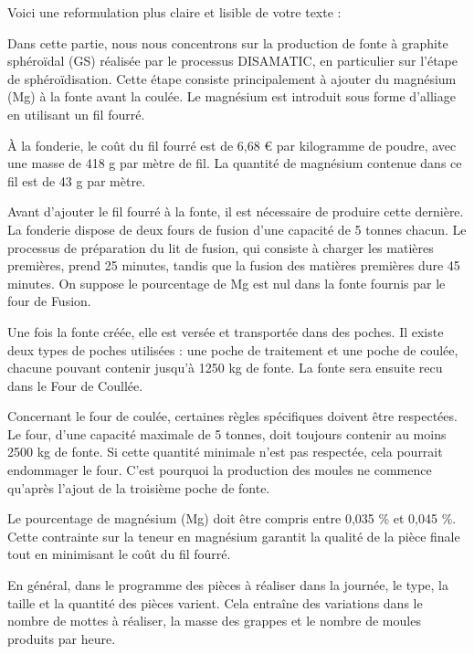 \documentclass[12pt]{article}
\begin{document}
Voici une reformulation plus claire et lisible de votre texte :

Dans cette partie, nous nous concentrons sur la production de fonte à 
graphite sphéroïdal (GS) réalisée par le processus DISAMATIC, en 
particulier sur l’étape de sphéroïdisation. Cette étape consiste 
principalement à ajouter du magnésium (Mg) à la fonte avant la coulée. 
Le magnésium est introduit sous forme d'alliage en utilisant un fil fourré.

À la fonderie, le coût du fil fourré est de 6,68 € par kilogramme de poudre,
avec une masse de 418 g par mètre de fil. La quantité de magnésium contenue
dans ce fil est de 43 g par mètre.

Avant d'ajouter le fil fourré à la fonte, il est nécessaire de produire 
cette dernière. La fonderie dispose de deux fours de fusion d'une capacité 
de 5 tonnes chacun. Le processus de préparation du lit de fusion, qui 
consiste à charger les matières premières, prend 25 minutes, tandis que 
la fusion des matières premières dure 45 minutes.
On suppose le pourcentage de Mg est nul dans la fonte fournis par le four de 
Fusion. 


Une fois la fonte créée, elle est versée et transportée dans des 
poches. Il existe deux types de poches utilisées : une poche de traitement 
et une poche de coulée, chacune pouvant contenir jusqu'à 1250 kg de fonte.
La fonte sera ensuite recu dans le Four de Coullée.


Concernant le four de coulée, certaines règles spécifiques doivent être 
respectées. Le four, d'une capacité maximale de 5 tonnes, doit toujours 
contenir au moins 2500 kg de fonte. Si cette quantité minimale n'est pas 
respectée, cela pourrait endommager le four. C’est pourquoi la production 
des moules ne commence qu’après l’ajout de la troisième poche de fonte.

Le pourcentage de magnésium (Mg) doit être compris entre 0,035 \% et 
0,045 \%. Cette contrainte sur la teneur en magnésium garantit la qualité 
de la pièce finale tout en minimisant le coût du fil fourré.

En général, dans le programme des pièces à réaliser dans la journée, 
le type, la taille et la quantité des pièces varient. Cela entraîne des 
variations dans le nombre de mottes à réaliser, la masse des grappes et 
le nombre de moules produits par heure.




\end{document}
